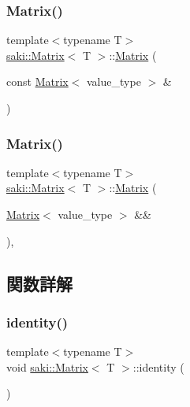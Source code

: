 \subsubsection{\texorpdfstring{Matrix()}{Matrix()}\hspace{0.1cm}{\footnotesize\ttfamily [5/6]}}
{\footnotesize\ttfamily template$<$typename T$>$ \\
\mbox{\hyperlink{classsaki_1_1_matrix}{saki\+::\+Matrix}}$<$ T $>$\+::\mbox{\hyperlink{classsaki_1_1_matrix}{Matrix}} (\begin{DoxyParamCaption}\item[{const \mbox{\hyperlink{classsaki_1_1_matrix}{Matrix}}$<$ value\+\_\+type $>$ \&}]{ }\end{DoxyParamCaption})\hspace{0.3cm}{\ttfamily [default]}}

\mbox{\label{classsaki_1_1_matrix_ac9348cfbd23fc23bdb2e00cabbff6c66}} 
\subsubsection{\texorpdfstring{Matrix()}{Matrix()}\hspace{0.1cm}{\footnotesize\ttfamily [6/6]}}
{\footnotesize\ttfamily template$<$typename T$>$ \\
\mbox{\hyperlink{classsaki_1_1_matrix}{saki\+::\+Matrix}}$<$ T $>$\+::\mbox{\hyperlink{classsaki_1_1_matrix}{Matrix}} (\begin{DoxyParamCaption}\item[{\mbox{\hyperlink{classsaki_1_1_matrix}{Matrix}}$<$ value\+\_\+type $>$ \&\&}]{ }\end{DoxyParamCaption})\hspace{0.3cm}{\ttfamily [default]}, {\ttfamily [noexcept]}}



\subsection{関数詳解}
\mbox{\label{classsaki_1_1_matrix_af0c4f3614c29e27eae5fecde22140be8}} 
\subsubsection{\texorpdfstring{identity()}{identity()}}
{\footnotesize\ttfamily template$<$typename T$>$ \\
void \mbox{\hyperlink{classsaki_1_1_matrix}{saki\+::\+Matrix}}$<$ T $>$\+::identity (\begin{DoxyParamCaption}{ }\end{DoxyParamCaption})\hspace{0.3cm}{\ttfamily [inline]}}



